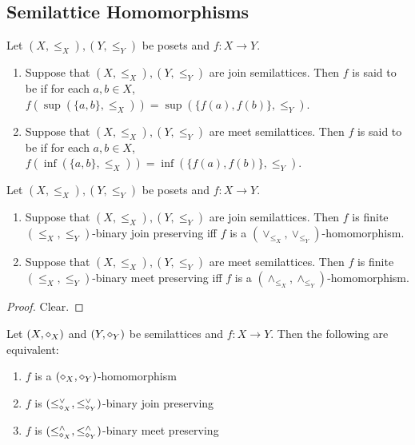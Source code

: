 \documentclass{book}
\begin{document}
	
	
	
	
	
	
	
	
	
	
	
	
	
	\subsection{Semilattice Homomorphisms}
	
	\begin{defn}
		Let $(X, \leq_X), (Y, \leq_Y)$ be posets and $f:X \rightarrow Y$. 
		\begin{enumerate}
			\item Suppose that $(X, \leq_X), (Y, \leq_Y)$ are join semilattices. Then $f$ is said to be  if for each $a,b \in X$, $f(\sup(\{a, b\}, \leq_X)) = \sup(\{f(a), f(b)\}, \leq_Y)$.
			\item Suppose that $(X, \leq_X), (Y, \leq_Y)$ are meet semilattices. Then $f$ is said to be  if for each $a,b \in X$, $f(\inf(\{a, b\}, \leq_X)) = \inf(\{f(a), f(b)\}, \leq_Y)$.
		\end{enumerate}
	\end{defn}
	
	\begin{ex}
		Let $(X, \leq_X), (Y, \leq_Y)$ be posets and $f:X \rightarrow Y$. 
		\begin{enumerate}
			\item Suppose that $(X, \leq_X), (Y, \leq_Y)$ are join semilattices. Then $f$ is finite $(\leq_X, \leq_Y)$-binary join preserving iff $f$ is a $(\vee_{\leq_X}, \vee_{\leq_Y})$-homomorphism.
			\item Suppose that $(X, \leq_X), (Y, \leq_Y)$ are meet semilattices. Then $f$ is finite $(\leq_X, \leq_Y)$-binary meet preserving iff $f$ is a $(\wedge_{\leq_X}, \wedge_{\leq_Y})$-homomorphism.
		\end{enumerate}
	\end{ex}
	
	\begin{proof}
		Clear.
	\end{proof}
	
	\begin{ex}
		Let $(X, \diamond_X)$ and $(Y, \diamond_Y)$ be semilattices and $f:X \rightarrow Y$. Then the following are equivalent:
		\begin{enumerate}
			\item $f$ is a $(\diamond_X, \diamond_Y)$-homomorphism
			\item $f$ is $(\leq_{\diamond_X}^{\vee}, \leq_{\diamond_Y}^{\vee})$-binary join preserving
			\item $f$ is $(\leq_{\diamond_X}^{\wedge}, \leq_{\diamond_Y}^{\wedge})$-binary meet preserving
		\end{enumerate}
	\end{ex}
	
\end{document}
